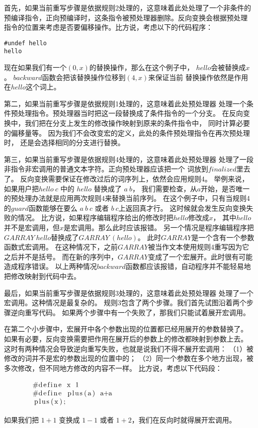 首先，如果当前重写步骤是依据规则2处理的，这意味着此处处理了一个非条件的
预编译指令，正向预编译时，这条指令被预处理器删除。反向变换会根据预处理
指令的位置来考虑是否要偏移操作。比方说，考虑以下的代码程序：
\begin{lstlisting}
#undef hello
hello
\end{lstlisting}
现在如果我们有一个$(0, x)$的替换操作，那么在这个例子中，
$hello$会被替换成$x$。
$backward$函数会把该替换操作位移到$(4, x)$来保证当前
替换操作依然是作用在$hello$这个词上。

第二，如果当前重写步骤是依据规则1处理的，这意味着此处预处理器
处理一个条件预处理指令。预处理器当时把这一段替换成了条件指令的一个分支。
在反向变换中，我们把在分支上发生的修改操作映射到原来的条件指令中，
同时计算必要的偏移量等。
因为我们不会改变宏的定义，此处的条件预处理指令在再次预处理时，
还是会选择相同的分支进行替换。

第三，如果当前重写步骤是依据规则4处理的，这意味着此处预处理器
处理了一段非指令非宏调用的普通文本字符。正向预处理器应该把一个
词放到$finalized$里去了。
反向变换需要保证在修改过后的词序列上，依然会应用规则4。
举例来说，如果用户把$hello\ c$ 中的 $hello$ 替换成了 $a\ b$，
我们需要检查，从$a$开始，是否唯一的预处理办法就是应用两次规则4来替换当前序列。
在这个例子中，只有当规则4的$guard$函数能够在要么 $a\ b\ c$ 或者 $b\ c$上返回真才行。
这时候就会发生反向变换失败的情况。
比方说，如果程序编辑程序给出的修改时把$hello$修改成$x$，
其中$hello$并不是宏调用，但$x$是宏调用。那么此时应该报错。
另一个情况是程序编辑程序把$GARRAY\ hello$替换成了$GARRAY\ (hello)$。
此时$GARRAY$是一个含有一个参数函数式宏调用。
在这种情况下，之前$GARRAY$被当作文本使用规则4重写因为它之后并不是括号。
而在新的序列中，$GARRAY$变成了一个宏展开。此时很有可能造成程序错误。
以上两种情况$backward$函数都应该报错，自动程序并不能轻易地把修改映射到代码中去。


最后，如果当前重写步骤是依据规则3处理的，这意味着此处预处理器
处理了一个宏调用。这种情况是最复杂的。
规则3包含了两个步骤。我们首先试图沿着两个步骤逆向重写代码。
如果两个步骤中有一个失败了，那我们只能试着展开宏调用。

在第二个小步骤中，宏展开中各个参数出现的位置都已经用展开的参数替换了。
如果有必要，反向变换需要把作用在展开后的参数上的修改都映射到参数上去。
这时有两种情况会导致逆向重写失败，也就是说我们不得不展开宏调用：
（1）被修改的词并不是宏的参数出现的位置中的；
（2）同一个参数在多个地方出现，被多次修改，但不同地方修改的内容不一样。
比方说，考虑以下代码段：
\begin{equation}\label{eqn:expansion}
  \begin{minipage}{0.8\columnwidth}
\begin{lstlisting}
#define x 1
#define plus(a) a+a
plus(x);
\end{lstlisting}
  \end{minipage}
\end{equation}
如果我们把 $1+1$ 变换成 $1-1$ 或者 $1+2$，我们在反向时就得展开宏调用。

